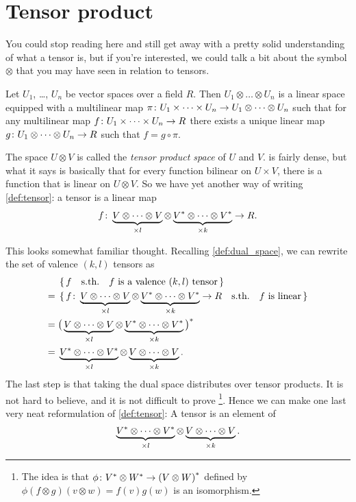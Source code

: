 \documentclass[english, 12pt]{article}
\begin{document}
\section{Tensor product}%
\label{sec:tensor_product}

You could stop reading here and still get away with a pretty solid understanding of what a tensor is, but if you're interested, we could talk a bit about the symbol \(\otimes\) that you may have seen in relation to tensors.

\begin{definition}\label{def:tensor_product}
	Let \(U_1\), \dots, \(U_n\) be vector spaces over a field \(R\).
	Then \(U_1 \otimes \dots \otimes U_n\) is a linear space equipped with a multilinear map \(\pi \colon U_1 \times \dots \times U_n \to U_1 \otimes \dots \otimes U_n\) such that for any multilinear map \(f \colon U_1 \times \dots \times U_n \to R\) there exists a unique linear map \(g \colon U_1 \otimes \dots \otimes U_n \to R\) such that \(f = g \circ \pi\).
\end{definition}

The space \(U \otimes V\) is called the \emph{tensor product space} of \(U\) and \(V\).
 is fairly dense, but what it says is basically that for every function bilinear on \(U \times V\), there is a function that is linear on \(U \otimes V\).
So we have yet another way of writing \cref{def:tensor}: a tensor is a linear map
\begin{align*}
	f \colon \underbrace{V \otimes \dots \otimes V}_{\times l} \otimes \underbrace{{V}^{*} \otimes \dots \otimes {V}^{*}}_{\times k} \to R.
\end{align*}

This looks somewhat familiar thought.
Recalling \cref{def:dual_space}, we can rewrite the set of valence \((k, l)\) tensors as
\begin{align*}
	&\set{f \quad \textrm{s.th.} \quad f \textrm{ is a valence \((k, l)\) tensor}}\\
	={}& \set{f \colon\underbrace{V \otimes \dots \otimes V}_{\times l} \otimes \underbrace{{V}^{*} \otimes \dots \otimes {V}^{*}}_{\times k} \to R \quad \textrm{s.th.} \quad f \text{ is linear}}\\
	={}& {\big( \underbrace{V \otimes \dots \otimes V}_{\times l} \otimes \underbrace{{V}^{*} \otimes \dots \otimes {V}^{*}}_{\times k} \big)}^{*}\\
	={}& \underbrace{{V}^{*} \otimes \dots \otimes {V}^{*}}_{\times l} \otimes \underbrace{V \otimes \dots \otimes V}_{\times k}.
\end{align*}
The last step is that taking the dual space distributes over tensor products.
It is not hard to believe, and it is not difficult to prove%
\footnote{%
	The idea is that \(\phi \colon {V}^{*} \otimes {W}^{*} \to {(V \otimes W)}^{*}\) defined by \(\phi(f \otimes g)(v \otimes w) = f(v) g(w)\) is an isomorphism.
}.
Hence we can make one last very neat reformulation of \cref{def:tensor}: A tensor is an element of
\begin{align*}
	\underbrace{{V}^{*} \otimes \dots \otimes {V}^{*}}_{\times l} \otimes \underbrace{V \otimes \dots \otimes V}_{\times k}.
\end{align*}
\end{document}
